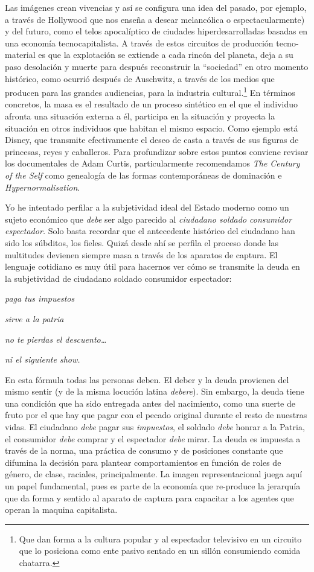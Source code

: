 Las imágenes crean vivencias y así se configura una idea del pasado, por ejemplo, a través de Hollywood que nos enseña a desear melancólica o espectacularmente) y del futuro, como el telos apocalíptico de ciudades hiperdesarrolladas basadas en una economía tecnocapitalista. A través de estos circuitos de producción tecno-material es que la explotación se extiende a cada rincón del planeta, deja a su paso desolación y muerte para después reconstruir la \enquote{sociedad} en otro momento histórico, como ocurrió después de Auschwitz, a través de los medios que producen para las grandes audiencias, para la industria cultural.\footnote{Que dan forma a la cultura popular y al espectador televisivo en un circuito que lo posiciona como ente pasivo sentado en un sillón consumiendo comida chatarra.} En términos concretos, la masa es el resultado de un proceso sintético en el que el individuo afronta una situación externa a él, participa en la situación y proyecta la situación en otros individuos que habitan el mismo espacio. Como ejemplo está Disney, que transmite efectivamente el deseo de casta a través de sus figuras de princesas, reyes y caballeros. Para profundizar sobre estos puntos conviene revisar los documentales de Adam Curtis, particularmente recomendamos \emph{The Century of the Self} como genealogía de las formas contemporáneas de dominación e \emph{Hypernormalisation}.

Yo he intentado perfilar a la subjetividad ideal del Estado moderno como un sujeto económico que \emph{debe} ser algo parecido al \emph{ciudadano soldado consumidor espectador.} Solo basta recordar que el antecedente histórico del ciudadano han sido los súbditos, los fieles. Quizá desde ahí se perfila el proceso donde las multitudes devienen siempre masa a través de los aparatos de captura. El lenguaje cotidiano es muy útil para hacernos ver cómo se transmite la deuda en la subjetividad de ciudadano soldado consumidor espectador:

\emph{paga tus impuestos}

\emph{sirve a la patria}

\emph{no te pierdas el descuento\ldots{}}

\emph{ni el siguiente show.}

En esta fórmula todas las personas deben. El deber y la deuda provienen del mismo sentir (y de la misma locución latina \emph{debere}). Sin embargo, la deuda tiene una condición que ha sido entregada antes del nacimiento, como una suerte de fruto por el que hay que pagar con el pecado original durante el resto de nuestras vidas. El ciudadano \emph{debe} pagar sus \emph{impuestos}, el soldado \emph{debe} honrar a la Patria, el consumidor \emph{debe} comprar y el espectador \emph{debe} mirar. La deuda es impuesta a través de la norma, una práctica de consumo y de posiciones constante que difumina la decisión para plantear comportamientos en función de roles de género, de clase, raciales, principalmente. La imagen representacional juega aquí un papel fundamental, pues es parte de la economía que re-produce la jerarquía que da forma y sentido al aparato de captura para capacitar a los agentes que operan la maquina capitalista.

